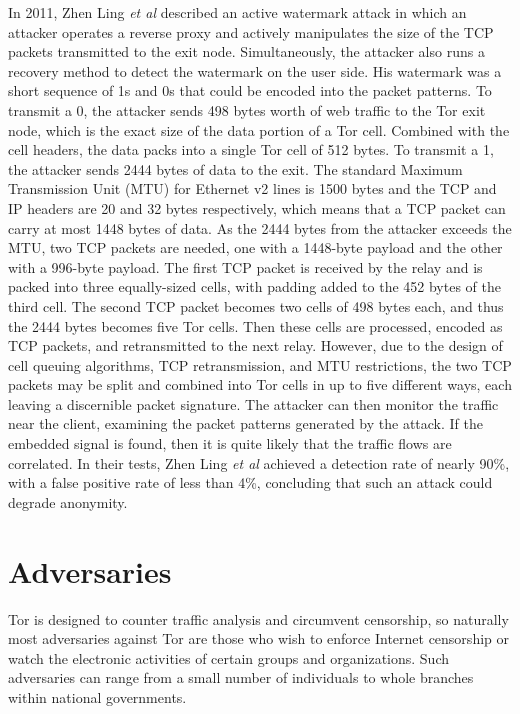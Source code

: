 \documentclass[journal]{IEEEtran}
\begin{document}
In 2011, Zhen Ling \textit{et al} described an active watermark attack in which an attacker operates a reverse proxy and actively manipulates the size of the TCP packets transmitted to the exit node. Simultaneously, the attacker also runs a recovery method to detect the watermark on the user side. His watermark was a short sequence of 1s and 0s that could be encoded into the packet patterns. To transmit a 0, the attacker sends 498 bytes worth of web traffic to the Tor exit node, which is the exact size of the data portion of a Tor cell. Combined with the cell headers, the data packs into a single Tor cell of 512 bytes. To transmit a 1, the attacker sends 2444 bytes of data to the exit. The standard Maximum Transmission Unit (MTU) for Ethernet v2 lines is 1500 bytes and the TCP and IP headers are 20 and 32 bytes respectively, which means that a TCP packet can carry at most 1448 bytes of data. As the 2444 bytes from the attacker exceeds the MTU, two TCP packets are needed, one with a 1448-byte payload and the other with a 996-byte payload. The first TCP packet is received by the relay and is packed into three equally-sized cells, with padding added to the 452 bytes of the third cell. The second TCP packet becomes two cells of 498 bytes each, and thus the 2444 bytes becomes five Tor cells. Then these cells are processed, encoded as TCP packets, and retransmitted to the next relay. However, due to the design of cell queuing algorithms, TCP retransmission, and MTU restrictions, the two TCP packets may be split and combined into Tor cells in up to five different ways, each leaving a discernible packet signature. The attacker can then monitor the traffic near the client, examining the packet patterns generated by the attack. If the embedded signal is found, then it is quite likely that the traffic flows are correlated. In their tests, Zhen Ling \textit{et al} achieved a detection rate of nearly 90\%, with a false positive rate of less than 4\%, concluding that such an attack could degrade anonymity.\cite{Ling2011}



\section{Adversaries}

Tor is designed to counter traffic analysis and circumvent censorship, so naturally most adversaries against Tor are those who wish to enforce Internet censorship or watch the electronic activities of certain groups and organizations. Such adversaries can range from a small number of individuals to whole branches within national governments.
\end{document}
